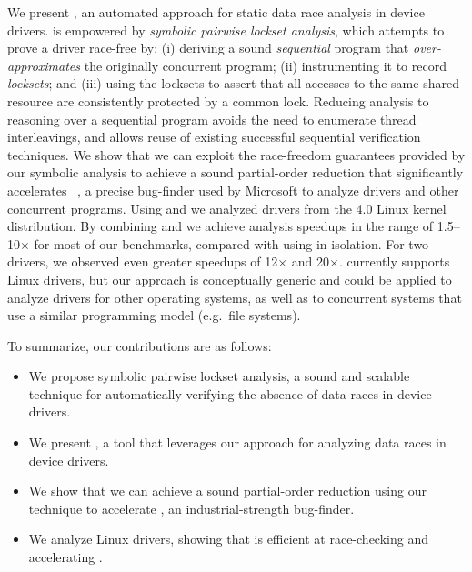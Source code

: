 We present \whoop, an automated approach for static data race analysis in device drivers. \whoop is empowered by \emph{symbolic pairwise lockset analysis}, which attempts to prove a driver race-free by: (i) deriving a sound \emph{sequential} program that \emph{over-approximates} the originally concurrent program; (ii) instrumenting it to record \emph{locksets}; and (iii) using the locksets to assert that all accesses to the same shared resource are consistently protected by a common lock. Reducing analysis to reasoning over a sequential program avoids the need to enumerate thread interleavings, and allows reuse of existing successful sequential verification techniques.
%
We show that we can exploit the race-freedom guarantees provided by our symbolic analysis to achieve a sound partial-order reduction that significantly accelerates \corral~\cite{lal2012corral}, a precise bug-finder used by Microsoft to analyze drivers and other concurrent programs. Using \whoop and \corral we analyzed \sizeOfBenchmarks drivers from the 4.0 Linux kernel distribution.  By combining \whoop and \corral we achieve analysis speedups in the range of 1.5--10$\times$ for most of our benchmarks, compared with using \corral in isolation.  For two drivers, we observed even greater speedups of 12$\times$ and 20$\times$.
%
\whoop currently supports Linux drivers, but our approach is conceptually generic and could be applied to analyze drivers for other operating systems, as well as to concurrent systems that use a similar programming model (e.g.\ file systems).

To summarize, our contributions are as follows:
\vspace{-0.5mm}
\begin{itemize}
\item We propose symbolic pairwise lockset analysis, a sound and scalable technique for automatically verifying the absence of data races in device drivers.
\vspace{-0.2mm}
\item We present \whoop, a tool that leverages our approach for analyzing data races in device drivers.
\vspace{-0.2mm}
\item We show that we can achieve a sound partial-order reduction using our technique to accelerate \corral, an industrial-strength bug-finder.
\vspace{-0.2mm}
\item We analyze \sizeOfBenchmarks Linux drivers, showing that \whoop is efficient at race-checking and accelerating \corral.
\end{itemize}
